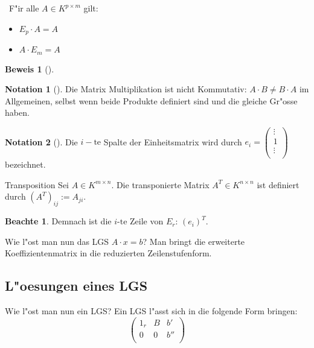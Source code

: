 \documentclass[oneside,fontsize=11pt,paper=a4,BCOR=0mm,DIV=12,automark,headsepline]{scrbook}
\theoremstyle{remark}
\theoremstyle{definition}
\newtheorem*{notte}{Beachte}
\newtheorem*{notation}{Notation}
\theoremstyle{definition}
\newtheorem*{prof}{Beweis}
\theoremstyle{remark}
\begin{document}
\begin{theo}{}{} \
  F"ir alle \(A\in K^{p\times m}\) gilt:
  \begin{itemize}
  \item \(E_p\cdot A=A\)
  \item \(A\cdot E_m =A\)
  \end{itemize}
\end{theo}

\begin{prof}[]

\end{prof}


\begin{notation}[]
  Die Matrix Multiplikation ist nicht Kommutativ: \(A\cdot B\not= B\cdot A\) im
  Allgemeinen, selbst wenn beide Produkte definiert sind und die gleiche Gr"osse
  haben.
\end{notation}

\begin{exa}

\end{exa}

\begin{notation}[]
  Die \(i-\text{te}\) Spalte der Einheitsmatrix wird durch \(e_i=
  \begin{pmatrix}
    \vdots \\
    1 \\
    \vdots\\
  \end{pmatrix}
\) bezeichnet.
\end{notation}

\begin{definition}{Transposition}{}
  Sei \(A\in K^{m\times n}\). Die transponierte Matrix \(A^{T}\in K^{n\times n}\) ist
  definiert durch \((A^T)_{ij}:=A_{ji}\).
\end{definition}

\begin{notte}
  Demnach ist die $i\text{-te}$ Zeile von $E_r$: \((e_i)^T\).
\end{notte}

Wie l"ost man nun das LGS \(A\cdot x=b\)? Man bringt die erweiterte
Koeffizientenmatrix in die reduzierten Zeilenstufenform.

\subsection{L"oesungen eines LGS}
Wie l"ost man nun ein LGS?
Ein LGS l"asst sich in die folgende Form bringen:
\[
  \left(
    \begin{array}{cc|c}
      1_r & B & b'\\
      0 & 0 & b''\\
    \end{array}\right)
\]
\end{document}
